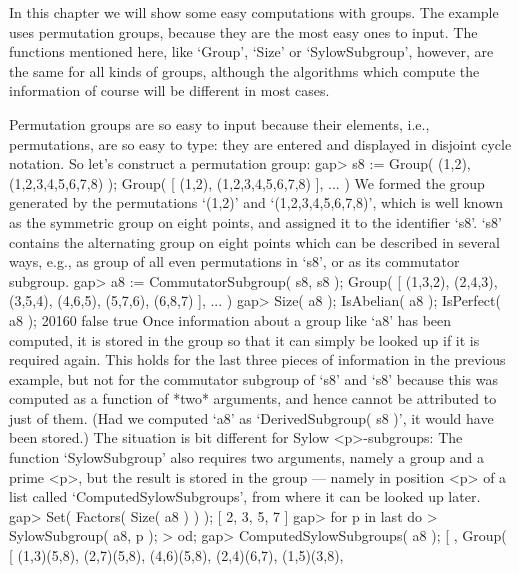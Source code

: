 
In this  chapter we will  show  some easy  computations with groups.  The
example uses permutation groups,  because they are  the most easy ones to
input.   The   functions  mentioned   here,   like   `Group',  `Size'  or
`SylowSubgroup', however, are the same for  all kinds of groups, although
the algorithms which compute the information of  course will be different
in most cases.


Permutation  groups  are so easy to  input  because their elements, i.e.,
permutations,  are  so easy to  type: they  are  entered and displayed in
disjoint cycle notation. So let's construct a permutation group:
\beginexample
    gap> s8 := Group( (1,2), (1,2,3,4,5,6,7,8) );
    Group( [ (1,2), (1,2,3,4,5,6,7,8) ], ... )
\endexample
We   formed  the  group  generated  by   the  permutations  `(1,2)'   and
`(1,2,3,4,5,6,7,8)',  which is well known as the symmetric group on eight
points,  and  assigned  it  to the  identifier `s8'.   `s8' contains  the
alternating group on eight points which can be described in several ways,
e.g., as group of  all even permutations in  `s8',  or  as its commutator
subgroup.
\beginexample
    gap> a8 := CommutatorSubgroup( s8, s8 );
    Group( [ (1,3,2), (2,4,3), (3,5,4), (4,6,5), (5,7,6), (6,8,7) ], ... )
    gap> Size( a8 ); IsAbelian( a8 ); IsPerfect( a8 );
    20160
    false
    true
\endexample
Once information about a group like `a8'  has been computed, it is stored
in the group so that it can simply be looked  up if it is required again.
This   holds for the  last three  pieces  of information  in the previous
example, but  not for the commutator   subgroup of `s8' and  `s8' because
this was computed as  a function of *two* arguments,  and hence cannot be
attributed to just of them. (Had we computed `a8' as `DerivedSubgroup( s8
)', it would have been stored.) The  situation is bit different for Sylow
<p>-subgroups: The  function `SylowSubgroup' also requires two arguments,
namely a group and a prime <p>, but the result is stored in the group ---
namely  in position <p> of   a list called `ComputedSylowSubgroups', from
where it can be looked up later.
\beginexample
    gap> Set( Factors( Size( a8 ) ) );
    [ 2, 3, 5, 7 ]
    gap> for p  in last  do
    >      SylowSubgroup( a8, p );
    >    od;
    gap> ComputedSylowSubgroups( a8 );
    [ , 
      Group( [ (1,3)(5,8), (2,7)(5,8), (4,6)(5,8), (2,4)(6,7), (1,5)(3,8),
